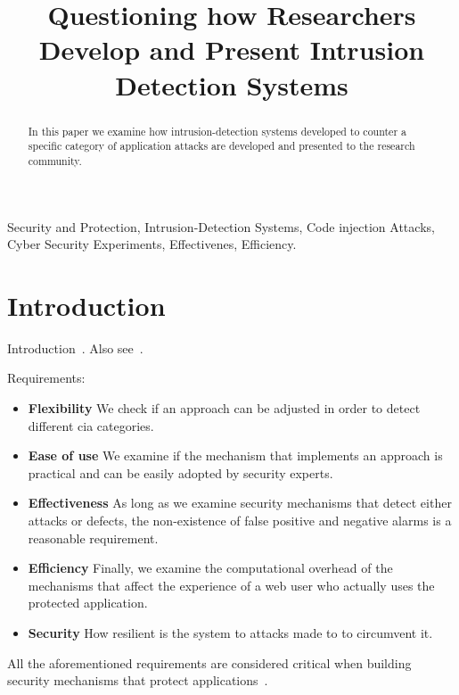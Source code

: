 \documentclass[conference]{IEEEtran}
\date{}
\begin{document}
\author{
}

\title{Questioning how Researchers Develop and Present Intrusion Detection Systems}

\maketitle
\begin{abstract}
In this paper we examine how intrusion-detection
systems developed to counter a specific category
of application attacks are developed and presented to
the research community.
\end{abstract}

\begin{IEEEkeywords}
Security and Protection, Intrusion-Detection Systems, Code injection Attacks, Cyber Security Experiments, Effectivenes, Efficiency.
\end{IEEEkeywords}

\IEEEpeerreviewmaketitle

\section{Introduction}

Introduction~\cite{I05}. Also see~\cite{A00}.

Requirements:
\begin{itemize}
\item {\bf Flexibility} We check if an approach
can be adjusted in order to detect different {\sc cia} categories.
\item {\bf Ease of use} We examine if the mechanism that
implements an approach is practical and can be easily adopted
by security experts.
\item {\bf Effectiveness} As long as we examine security
mechanisms that detect either attacks or defects,
the non-existence of false positive and negative alarms
is a reasonable requirement.
\item {\bf Efficiency} Finally, we examine
the computational overhead of the mechanisms that affect the experience of
a web user who actually uses the protected application.
\item {\bf Security} How resilient is the system to
attacks made to to circumvent it.
\end{itemize}
All the aforementioned requirements are considered critical
when building security mechanisms that protect
applications~\cite{A01,A00}.
\end{document}
